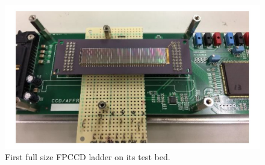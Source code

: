 \begin{figure}[t!]
\centering
\includegraphics[width=0.6\hsize]{Detector/fig/VTX_FPCCD.jpg}
\caption{First full size FPCCD ladder on its test bed.}
\label{fig:det:VTX_FPCCD}
\end{figure}

\vspace{2cm}